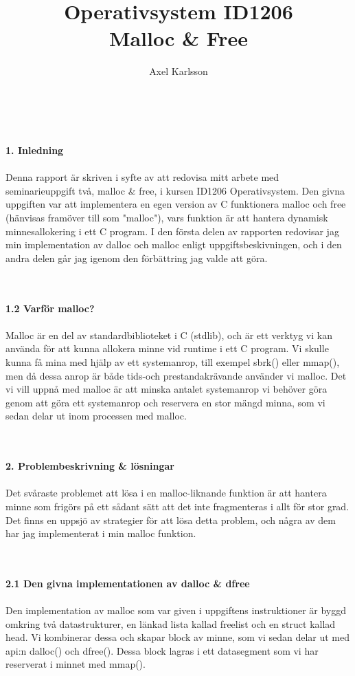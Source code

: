 \documentclass[a4paper,10pt]{article}
\title{\textbf{Operativsystem ID1206} \\ 
\textbf{Malloc \& Free}}
\author{Axel Karlsson}
\begin{document}
\maketitle
\textbf
{\\\\1. Inledning\\\\}
Denna rapport är skriven i syfte av att redovisa mitt arbete med seminarieuppgift två, malloc \& free, i kursen ID1206 Operativsystem. Den givna uppgiften var att implementera en egen version av C funktionera malloc och free (hänvisas framöver till som "malloc"), vars funktion är att hantera dynamisk minnesallokering i ett C program. I den första delen av rapporten redovisar jag min implementation av dalloc och malloc enligt uppgiftsbeskivningen, och i den andra delen går jag igenom den förbättring jag valde att göra.

\maketitle
\textbf
{\\\\1.2 Varför malloc?\\\\}
Malloc är en del av standardbiblioteket i C (stdlib), och är ett verktyg vi kan använda för att kunna allokera minne vid runtime i ett C program. Vi skulle kunna få mina med hjälp av ett systemanrop, till exempel sbrk() eller mmap(), men då dessa anrop är både tids-och prestandakrävande använder vi malloc. Det vi vill uppnå med malloc är att minska antalet systemanrop vi behöver göra genom att göra ett systemanrop och reservera en stor mängd minna, som vi sedan delar ut inom processen med malloc.

\maketitle
\textbf
{\\\\2. Problembeskrivning \& lösningar\\\\}
Det svåraste problemet att lösa i en malloc-liknande funktion är att hantera minne som frigörs på ett sådant sätt att det inte fragmenteras i allt för stor grad. Det finns en uppsjö av strategier för att lösa detta problem, och några av dem har jag implementerat i min malloc funktion.

\maketitle
\textbf
{\\\\2.1 Den givna implementationen av dalloc \& dfree\\\\}
Den implementation av malloc som var given i uppgiftens instruktioner är byggd omkring två datastrukturer, en länkad lista kallad freelist och en struct kallad head. Vi kombinerar dessa och skapar block av minne, som vi sedan delar ut med api:n dalloc() och dfree(). Dessa block lagras i ett datasegment som vi har reserverat i minnet med mmap(). 
\end{document}

